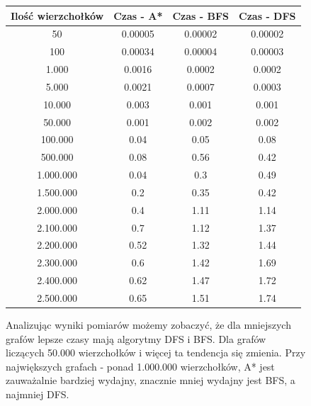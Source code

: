 \documentclass[a4paper,11pt]{report}
\begin{document}
\begin{figure}
  \begin{center}

  \begin{tabular}{|c|c|c|c|}
  \hline 
  Ilość wierzchołków & Czas - A* & Czas - BFS & Czas - DFS\\
  \hline
  50 & 0.00005 & 0.00002 & 0.00002\\
  \hline
  100 & 0.00034 & 0.00004 & 0.00003\\
  \hline
  1.000	& 0.0016 & 0.0002 & 0.0002\\
  \hline
  5.000	& 0.0021 & 0.0007 &  0.0003\\
  \hline
  10.000 & 0.003 & 0.001 & 0.001\\
  \hline
  50.000 & 0.001 & 0.002 & 0.002\\
  \hline
  100.000 & 0.04 &  0.05 & 0.08 \\
  \hline
  500.000 & 0.08 & 0.56  &  0.42\\
  \hline
  1.000.000 & 0.04 & 0.3 & 0.49 \\
  \hline
  1.500.000 &	0.2  & 0.35  & 0.42\\
  \hline
  2.000.000 & 0.4 & 1.11  &  1.14\\
  \hline
  2.100.000 & 0.7 & 1.12  &  1.37\\
  \hline
  2.200.000 & 0.52 & 1.32  & 1.44 \\
  \hline
  2.300.000 & 0.6 & 1.42  & 1.69 \\
  \hline
  2.400.000 & 0.62 & 1.47  & 1.72 \\
  \hline
  2.500.000 & 0.65 &  1.51 & 1.74 \\
  \hline
\end{tabular}
\end{center}
\end{figure}

\begin{figure}
  \begin{center}
\begin{flushleft}

Analizując wyniki pomiarów możemy zobaczyć, że dla mniejszych grafów lepsze czasy mają algorytmy DFS i BFS. Dla grafów liczących 50.000 wierzchołków i więcej ta tendencja się zmienia. Przy największych grafach - ponad 1.000.000 wierzchołków, A* jest zauważalnie bardziej wydajny, znacznie mniej wydajny jest BFS, a najmniej DFS.

\end{flushleft}
  \end{center}
\end{figure}
\end{document}
